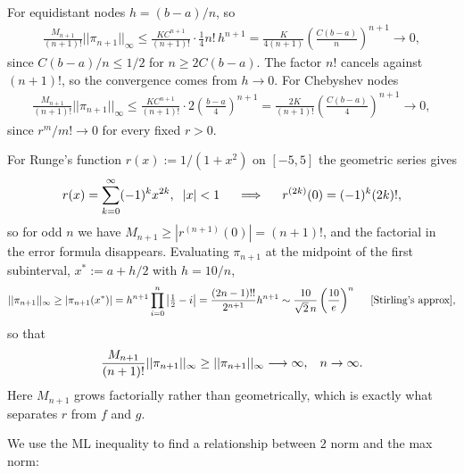 \documentclass{article}
\begin{document}
\vspace{5mm}
For equidistant nodes $h = (b-a)/n$, so
\begin{align*}
    \frac{M_{n+1}}{(n+1)!}||\pi_{n+1}||_{\infty} \le \frac{K C^{n+1}}{(n+1)!}\cdot\frac{1}{4}n!\,h^{n+1}
    = \frac{K}{4(n+1)}\left(\frac{C(b-a)}{n}\right)^{n+1} \longrightarrow 0,
\end{align*}
since $C(b-a)/n \le 1/2$ for $n \ge 2C(b-a)$. The factor $n!$ cancels against $(n+1)!$, so the convergence comes
from $h \to 0$. For Chebyshev nodes
\begin{align*}
    \frac{M_{n+1}}{(n+1)!}||\pi_{n+1}||_{\infty} \le \frac{K C^{n+1}}{(n+1)!}\cdot 2\left(\frac{b-a}{4}\right)^{n+1}
    = \frac{2K}{(n+1)!}\left(\frac{C(b-a)}{4}\right)^{n+1} \longrightarrow 0,
\end{align*}
since $r^{m}/m! \to 0$ for every fixed $r > 0$. 

\vspace{5mm}
For Runge's function $r(x) := 1/(1+x^2)$ on $[-5,5]$ the geometric series gives
\begin{align*}
    r(x) = \sum_{k=0}^{\infty}(-1)^k x^{2k}, \hspace{2mm} |x| < 1 \hspace{5mm} \Longrightarrow \hspace{5mm} r^{(2k)}(0) = (-1)^k (2k)!,
\end{align*}
so for odd $n$ we have $M_{n+1} \ge |r^{(n+1)}(0)| = (n+1)!$, and the factorial in the error formula disappears. Evaluating $\pi_{n+1}$ at the midpoint of the first subinterval, $x^* := a + h/2$ with $h = 10/n$,
\begin{align*}
    ||\pi_{n+1}||_{\infty} \ge |\pi_{n+1}(x^*)| = h^{n+1}\prod_{i=0}^{n}\left|\tfrac{1}{2} - i\right|
    = \frac{(2n-1)!!}{2^{n+1}} h^{n+1} \sim \frac{10}{\sqrt{2}\,n}\left(\frac{10}{e}\right)^{n} \hspace{5mm} [\text{Stirling's approx}],
\end{align*}
so that
\begin{align*}
    \frac{M_{n+1}}{(n+1)!}||\pi_{n+1}||_{\infty} \ge ||\pi_{n+1}||_{\infty} \longrightarrow \infty, \hspace{3mm} n \to \infty.
\end{align*}
Here $M_{n+1}$ grows factorially rather than geometrically, which is exactly what separates $r$ from
$f$ and $g$.

\vspace{5mm}
We use the ML inequality to find a relationship between $2$ norm and the max norm:
\end{document}

